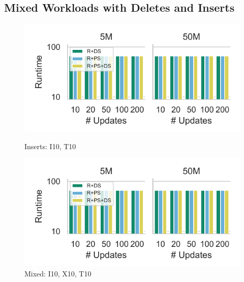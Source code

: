 \subsection{Mixed Workloads with Deletes and Inserts}\label{sec:mixed-workl-updat}

\begin{figure}[t]
  \begin{minipage}[b]{0.47\linewidth}
    \centering
		\includegraphics[width=1.1\linewidth,trim=10 9 15 10, clip]{imgs/felix_inserts.pdf}
		\vspace{-6.5mm}
		\caption{Inserts: I10, T10}
		\label{fig:Inserts at I10}
	\end{minipage}
	\begin{minipage}[b]{0.52\linewidth}
      \centering
      \hspace{3mm}
      \includegraphics[width=0.9\linewidth,trim=30 9 15 10, clip]{imgs/felix_mixed.pdf}
		\vspace{-2.5mm}
		\caption{Mixed: I10, X10, T10}
		\label{fig:Mixed Updates at IX10}
	\end{minipage}
\end{figure}


